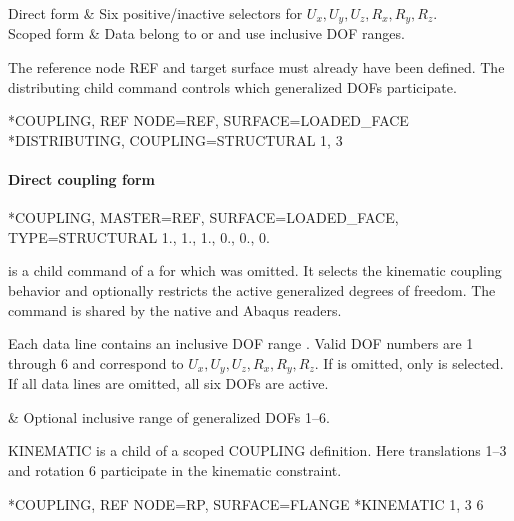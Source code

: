 \begin{keyworddata}
Direct form & Six positive/inactive selectors for \(U_x,U_y,U_z,R_x,R_y,R_z\). \\
Scoped form & Data belong to  or  and use inclusive DOF ranges. \\
\end{keyworddata}

The reference node REF and target surface  must already have been defined. The distributing child command controls which generalized DOFs participate.

\exampleheading

\begin{inputdeck}
*COUPLING, REF NODE=REF, SURFACE=LOADED_FACE
*DISTRIBUTING, COUPLING=STRUCTURAL
1, 3
\end{inputdeck}

\paragraph*{Direct coupling form}
\begin{inputdeck}
*COUPLING, MASTER=REF, SURFACE=LOADED_FACE, TYPE=STRUCTURAL
1., 1., 1., 0., 0., 0.
\end{inputdeck}


 is a child command of a  for which  was omitted. It selects the kinematic coupling behavior and optionally restricts the active generalized degrees of freedom. The command is shared by the native and Abaqus readers.

Each data line contains an inclusive DOF range . Valid DOF numbers are 1 through 6 and correspond to \(U_x,U_y,U_z,R_x,R_y,R_z\). If  is omitted, only  is selected. If all data lines are omitted, all six DOFs are active.

\begin{keyworddata}
 & Optional inclusive range of generalized DOFs 1--6. \\
\end{keyworddata}

KINEMATIC is a child of a scoped COUPLING definition. Here translations 1--3 and rotation 6 participate in the kinematic constraint.

\exampleheading
\begin{inputdeck}
*COUPLING, REF NODE=RP, SURFACE=FLANGE
*KINEMATIC
1, 3
6
\end{inputdeck}

